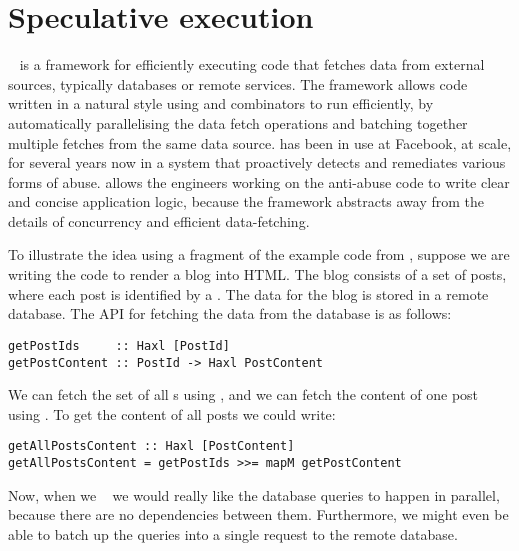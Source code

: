 \section{Speculative execution}\label{sec-haxl}

\Haxl~\citep{marlow2014haxl} is a framework for efficiently executing
code that fetches data from external sources, typically databases or
remote services. The \Haxl framework allows code written in a natural
style using  and  combinators to run
efficiently, by automatically parallelising the data fetch operations
and batching together multiple fetches from the same data source.
\Haxl has been in use at Facebook, at scale, for several years now in
a system that proactively detects and remediates various forms of
abuse. \Haxl allows the engineers working on the anti-abuse code to
write clear and concise application logic, because the framework
abstracts away from the details of concurrency and efficient
data-fetching.

To illustrate the idea using a fragment of the example code from
\citep{marlow2014haxl}, suppose we are writing the code to render a blog into
HTML. The blog consists of a set of posts, where each post is
identified by a .  The data for the blog is stored in a
remote database.  The API for fetching the data from the database is
as follows:

\vspace{1mm}
\begin{verbatim}
getPostIds     :: Haxl [PostId]
getPostContent :: PostId -> Haxl PostContent
\end{verbatim}
\vspace{1mm}

\noindent
We can fetch the set of all s using , and we
can fetch the content of one post using . To get
the content of all posts we could write:

\vspace{1mm}
\begin{verbatim}
getAllPostsContent :: Haxl [PostContent]
getAllPostsContent = getPostIds >>= mapM getPostContent
\end{verbatim}
\vspace{1mm}

\noindent
Now, when we ~ we would really like the
database queries to happen in parallel, because there are no
dependencies between them. Furthermore, we might even be able to batch
up the queries into a single request to the remote database.

